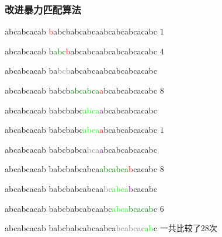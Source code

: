 \documentclass{ctexbeamer}
\newcommand{\red}[1]{\textcolor{red}{#1}}
\newcommand{\green}[1]{\textcolor{green}{#1}}
\newcommand{\gray}[1]{\textcolor{gray}{#1}}
\newcommand{\lime}[1]{\textcolor{lime}{#1}}
\newcommand{\purple}[1]{\textcolor{purple}{#1}}
\begin{document}
\begin{frame}[fragile]
\frametitle{改进暴力匹配算法}

\begin{tverb}
abcabcacab
\red{b}abcbabcabcaabcabcabcacabc \(1\)
\end{tverb}

	\begin{tverb}
 abcabcacab
b\green{abc}\red{b}abcabcaabcabcabcacabc \(4\)
	\end{tverb}

\begin{tverb}
     abcabcacab
ba\gray{bcb}abcabcaabcabcabcacabc
\end{tverb}

\begin{tverb}
     abcabcacab
babcb\green{abcabca}\red{a}bcabcabcacabc \(8\)
\end{tverb}

\begin{tverb}
        abcabcacab
babcbabc\lime{abca}\purple{a}bcabcabcacabc
\end{tverb}

\begin{tverb}
        abcabcacab
babcbabc\lime{abca}\red{a}bcabcabcacabc \(1\)
\end{tverb}

\begin{tverb}
            abcabcacab
babcbabca\gray{bca}\purple{a}bcabcabcacabc
\end{tverb}

\begin{tverb}
            abcabcacab
babcbabcabca\green{abcabca}\red{b}cacabc \(8\)
\end{tverb}

\begin{tverb}
               abcabcacab
babcbabcabcaa\gray{bc}\lime{abca}\purple{b}cacabc
\end{tverb}

\begin{tverb}
               abcabcacab
babcbabcabcaabc\lime{abca}\green{bcacab}c \(6\)
\end{tverb}

\begin{tverb}
                       abcabcacab
babcbabcabcaabca\gray{bcabcac}\lime{ab}c           一共比较了\(28\)次
\end{tverb}

\end{frame}
\end{document}
